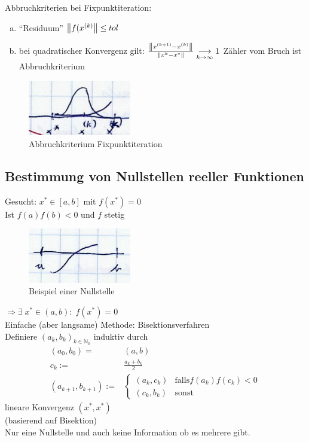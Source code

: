 Abbruchkriterien bei Fixpunktiteration:
\begin{enumerate}[a)]
  \item ``Residuum'' $\left\lVert f(x^{(k)} \right\rVert \leq tol$
  \item bei quadratischer Konvergenz gilt: $\frac{\left\lVert x^{(k+1)} - x^{(k)} \right\rVert}{\left\lVert x^k - x^* \right\rVert} \underset{k \rightarrow \infty}{\longrightarrow} 1$
    Zähler vom Bruch ist Abbruchkriterium
\end{enumerate}
\begin{figure}[htbp]
  \centering
  \includegraphics[width=0.4\textwidth]{figures/abbruchkriterium.png}
  \caption{Abbruchkriterium Fixpunktiteration}
\end{figure}

\subsection{Bestimmung von Nullstellen reeller Funktionen}
Gesucht: $x^* \in [a,b]$ mit $f(x^*) = 0$\\
Ist $f(a)f(b) < 0$ und $f$ stetig
\begin{figure}[htbp]
  \centering
  \includegraphics[width=0.4\textwidth]{figures/nst_bsp.png}
  \caption{Beispiel einer Nullstelle}
\end{figure}
$\Rightarrow \exists\; x^* \in (a,b):\;f(x^*) = 0$\\
Einfache (aber langsame) Methode: Bisektionsverfahren\\
Definiere $(a_k, b_k)_{k \in \mathbb{N}_0}$ induktiv durch
\begin{align*}
  (a_0, b_0) =& (a, b)\\
  c_k :=& \frac{a_k + b_k}{2}\\
  (a_{k+1}, b_{k+1}) :=& \begin{cases}
    (a_k, c_k) &\mbox{falls} f(a_k)f(c_k) < 0\\
    (c_k, b_k) &\mbox{sonst}
  \end{cases}
\end{align*}
lineare Konvergenz $(x^*, x^*)$\\
 (basierend auf Bisektion)\\
Nur eine Nullstelle und auch keine Information ob es mehrere gibt.\\

